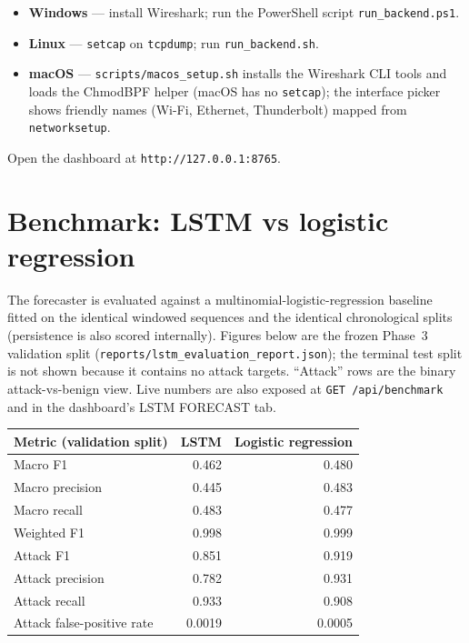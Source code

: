\documentclass[11pt,a4paper]{article}
\begin{document}
\begin{itemize}
  \item \textbf{Windows} --- install Wireshark; run the PowerShell script
  \texttt{run\_backend.ps1}.
  \item \textbf{Linux} --- \texttt{setcap} on \texttt{tcpdump}; run
  \texttt{run\_backend.sh}.
  \item \textbf{macOS} --- \texttt{scripts/macos\_setup.sh} installs the
  Wireshark CLI tools and loads the ChmodBPF helper (macOS has no
  \texttt{setcap}); the interface picker shows friendly names
  (Wi-Fi, Ethernet, Thunderbolt) mapped from \texttt{networksetup}.
\end{itemize}

Open the dashboard at \texttt{http://127.0.0.1:8765}.

\section{Benchmark: LSTM vs logistic regression}

The forecaster is evaluated against a multinomial-logistic-regression baseline
fitted on the identical windowed sequences and the identical chronological
splits (persistence is also scored internally). Figures below are the frozen
Phase~3 validation split (\texttt{reports/lstm\_evaluation\_report.json}); the
terminal test split is not shown because it contains no attack targets.
``Attack'' rows are the binary attack-vs-benign view. Live numbers are also
exposed at \texttt{GET /api/benchmark} and in the dashboard's LSTM FORECAST tab.

\begin{center}
\begin{tabular}{@{}lrr@{}}
  \toprule
  Metric (validation split) & LSTM & Logistic regression \\
  \midrule
  Macro F1                  & 0.462 & 0.480 \\
  Macro precision           & 0.445 & 0.483 \\
  Macro recall              & 0.483 & 0.477 \\
  Weighted F1               & 0.998 & 0.999 \\
  Attack F1                 & 0.851 & 0.919 \\
  Attack precision          & 0.782 & 0.931 \\
  Attack recall             & 0.933 & 0.908 \\
  Attack false-positive rate& 0.0019 & 0.0005 \\
  \bottomrule
\end{tabular}
\end{center}
\end{document}
